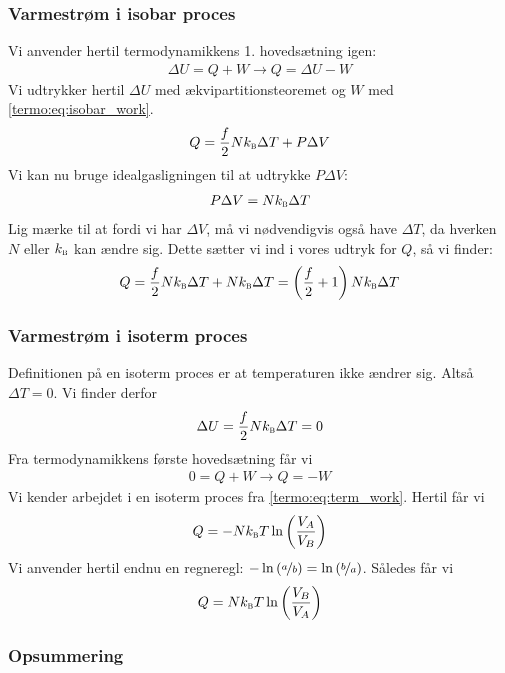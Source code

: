 \documentclass[crop=false, class=memoir]{standalone}
\begin{document}
\subsubsection{Varmestrøm i isobar proces}

Vi anvender hertil termodynamikkens 1. hovedsætning igen:
\begin{align}
    \Delta U = Q + W \rightarrow Q = \Delta U - W
\end{align}
Vi udtrykker hertil $\Delta U$ med ækvipartitionsteoremet og $W$ med \cref{termo:eq:isobar_work}.
\begin{align}
    Q = \frac{f}{2}Nk_\textsc{b} \Delta T + P \Delta V
\end{align}
Vi kan nu bruge idealgasligningen til at udtrykke $P\Delta V$:
\begin{align}
    P\Delta V = Nk_\textsc{b} \Delta T
\end{align}
Lig mærke til at fordi vi har $\Delta V$, må vi nødvendigvis også have $\Delta T$, da hverken $N$ eller $k_\textsc{b}$ kan ændre sig. Dette sætter vi ind i vores udtryk for $Q$, så vi finder:
\begin{align}
    Q = \frac{f}{2}Nk_\textsc{b} \Delta T + Nk_\textsc{b} \Delta T = \left(\frac{f}{2} + 1\right)N k_\textsc{b} \Delta T
\end{align}

\subsubsection{Varmestrøm i isoterm proces}

Definitionen på en isoterm proces er at temperaturen ikke ændrer sig. Altså $\Delta T = 0$. Vi finder derfor
\begin{align}
    \Delta U = \frac{f}{2} Nk_\textsc{b} \Delta T = 0
\end{align}
Fra termodynamikkens første hovedsætning får vi
\begin{align}
    0 = Q + W \rightarrow Q = -W
\end{align}
Vi kender arbejdet i en isoterm proces fra \cref{termo:eq:term_work}. Hertil får vi
\begin{align}
    Q = -Nk_\textsc{b} T \ln{\left( \frac{V_A}{V_B} \right)}
\end{align}
Vi anvender hertil endnu en regneregl: $-\ln{(\nicefrac{a}{b})} = \ln{(\nicefrac{b}{a})}$. Således får vi
\begin{align}
    Q = Nk_\textsc{b} T \ln{\left( \frac{V_B}{V_A} \right)}
\end{align}

\subsubsection{Opsummering}
\end{document}
